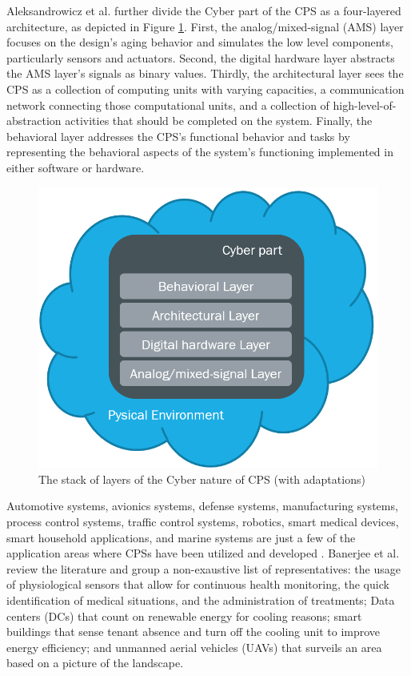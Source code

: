 Aleksandrowicz et al. \cite{aleksandrowicz2018designing} further divide the Cyber part of the CPS as a four-layered architecture, as depicted in Figure \ref{fig:cyber_cps}. First, the analog/mixed-signal (AMS) layer focuses on the design's aging behavior and simulates the low level components, particularly sensors and actuators. Second, the digital hardware layer abstracts the AMS layer's signals as binary values. Thirdly, the architectural layer sees the CPS as a collection of computing units with varying capacities, a communication network connecting those computational units, and a collection of high-level-of-abstraction activities that should be completed on the system. Finally, the behavioral layer addresses the CPS's functional behavior and tasks by representing the behavioral aspects of the system's functioning implemented in either software or hardware.

\begin{figure}[!htb]
	\centering
	\includegraphics[width=0.5\linewidth]{img/cyber_CPS.png}
	\caption{The stack of layers of the Cyber nature of CPS \cite{aleksandrowicz2018designing} (with adaptations)}
   \label{fig:cyber_cps}
\end{figure}  



Automotive systems, avionics systems, defense systems, manufacturing systems, process control systems, traffic control systems, robotics, smart medical devices, smart household applications, and marine systems are just a few of the application areas where CPSs have been utilized and developed \cite{bolbot2019vulnerabilities}. Banerjee et al. \cite{banerjee2011ensuring} review the literature and group a non-exaustive list of representatives: the usage of physiological sensors that allow for continuous health monitoring, the quick identification of medical situations, and the administration of treatments; Data centers (DCs) that count on renewable energy for cooling reasons; smart buildings that sense tenant absence and turn off the cooling unit to improve energy efficiency; and unmanned aerial vehicles (UAVs) that surveils an area based on a picture of the landscape.

